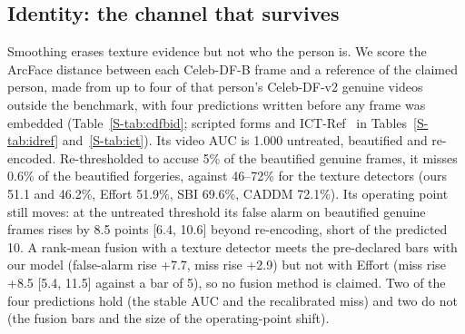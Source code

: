 \documentclass[journal]{IEEEtran}  %
\begin{document}
\subsection{Identity: the channel that survives}
\label{sec:identity}
Smoothing erases texture evidence but not who the person is. We score the ArcFace distance between each Celeb-DF-B frame and
a reference of the claimed person, made from up to four of that person's Celeb-DF-v2 genuine videos outside the benchmark, with
four predictions written before any frame was embedded (Table~\ref{S-tab:cdfbid}; scripted forms and ICT-Ref~\cite{ict2022} in
Tables~\ref{S-tab:idref} and~\ref{S-tab:ict}). Its video AUC is 1.000 untreated, beautified and re-encoded. Re-thresholded to
accuse 5\% of the beautified genuine frames, it misses 0.6\% of the beautified forgeries, against 46--72\% for the texture
detectors (ours 51.1 and 46.2\%, Effort 51.9\%, SBI 69.6\%, CADDM 72.1\%). Its operating point still moves: at the untreated
threshold its false alarm on beautified genuine frames rises by 8.5 points [6.4, 10.6] beyond re-encoding, short of the
predicted 10. A rank-mean fusion with a texture detector meets the pre-declared bars with our model (false-alarm rise +7.7, miss
rise +2.9) but not with Effort (miss rise +8.5 [5.4, 11.5] against a bar of 5), so no fusion method is claimed. Two of the four predictions hold (the stable AUC and the recalibrated miss) and two do not (the fusion bars and the size of the operating-point shift).
\end{document}
